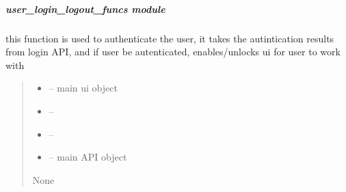 \documentclass[letterpaper,10pt,english]{sphinxmanual}
\begin{document}
\subparagraph{user\_login\_logout\_funcs module}
\label{\detokenize{setting/backend/user_login_logout_funcs:module-oxin.backend.user_login_logout_funcs}}\label{\detokenize{setting/backend/user_login_logout_funcs:user-login-logout-funcs-module}}\label{\detokenize{setting/backend/user_login_logout_funcs::doc}}

\begin{savenotes}\begin{fulllineitems}
\label{\detokenize{setting/backend/user_login_logout_funcs:oxin.backend.user_login_logout_funcs.authenticate_user}}
\pysigstartsignatures
{}
\pysigstopsignatures
\sphinxAtStartPar
this function is used to authenticate the user,
it takes the autintication results from login API, and if user be autenticated, enables/unlocks ui for user to work with
\begin{quote}\begin{description}
\begin{itemize}
\item {} 
\sphinxAtStartPar
{} – main ui object

\item {} 
\sphinxAtStartPar
{} – 

\item {} 
\sphinxAtStartPar
{} – 

\item {} 
\sphinxAtStartPar
{} – main API object

\end{itemize}

\sphinxAtStartPar
None

\end{description}\end{quote}

\end{fulllineitems}\end{savenotes}
\end{document}
